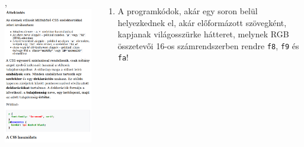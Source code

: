 \begin{frame}
  \begin{columns}[c]
      \begin{exampleblock}{, }
        \includegraphics[width=\textwidth]{css2.png}
      \end{exampleblock}
      \begin{enumerate}
        \setcounter{enumi}{\thefeladatSzamlalo}
        \small
        \item A programkódok, akár egy soron belül helyezkednek el, akár előformázott szövegként, kapjanak világosszürke hátteret, melynek RGB összetevői 16-os számrendszerben rendre \texttt{f8}, \texttt{f9} és \texttt{fa}!

\end{enumerate}
\end{columns}
\end{frame}
